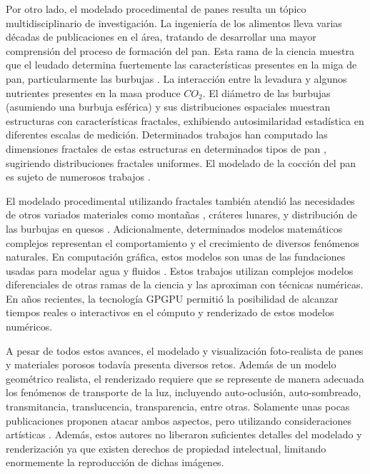 Por otro lado, el modelado procedimental de panes resulta un tópico multidisciplinario de investigación.
La ingeniería de los alimentos lleva varias décadas de publicaciones en el área, tratando de desarrollar una mayor comprensión del proceso de formación del pan.
Esta rama de la ciencia muestra que el leudado determina fuertemente las características presentes en la miga de pan, particularmente las burbujas \cite{Babin2006}.
La interacción entre la levadura y algunos nutrientes presentes en la masa produce {\em $CO_{2}$}. 
El diámetro de las burbujas (asumiendo una burbuja esférica) y sus distribuciones espaciales muestran estructuras con características fractales, exhibiendo autosimilaridad estadística en diferentes escalas de medición.
Determinados trabajos han computado las dimensiones fractales de estas estructuras en determinados tipos de pan \cite{Gonzales2008}, sugiriendo distribuciones fractales uniformes.
El modelado de la cocción del pan es sujeto de numerosos trabajos \cite{Mondal2008}.

El modelado procedimental utilizando fractales también atendió las necesidades de otros variados materiales como montañas \cite{Prusinkiewicz1993}, cráteres lunares, y distribución de las burbujas en quesos \cite{Mandelbrot1983}. 
Adicionalmente, determinados modelos matemáticos complejos representan el comportamiento y el crecimiento de diversos fenómenos naturales.
En computación gráfica, estos modelos son unas de las fundaciones usadas para modelar agua y fluidos \cite{Stam1999,Fedkiw2001}.
Estos trabajos utilizan complejos modelos diferenciales de otras ramas de la ciencia y las aproximan con técnicas numéricas.
En años recientes, la tecnología GPGPU \cite{Owens2007} permitió la posibilidad de alcanzar tiempos reales o interactivos en el cómputo y renderizado de estos modelos numéricos.

A pesar de todos estos avances, el modelado y visualización foto-realista de panes y materiales porosos todavía presenta diversos retos.
Además de un modelo geométrico realista, el renderizado requiere que se represente de manera adecuada los fenómenos de transporte de la luz, incluyendo auto-oclusión, auto-sombreado, transmitancia, translucencia, transparencia, entre otras.
Solamente unas pocas publicaciones proponen atacar ambos aspectos, pero utilizando consideraciones artísticas \cite{Xenakis2007}.
Además, estos autores no liberaron suficientes detalles del modelado y renderización ya que existen derechos de propiedad intelectual, limitando enormemente la reproducción de dichas imágenes.

